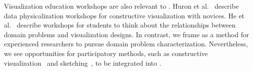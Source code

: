 Visualization education workshops are also relevant to \workshops. Huron et al.~\cite{Huron2016} describe data physicalization workshops for constructive visualization with novices. He et al.~\cite{He2017} describe workshops for students to think about the relationships between domain problems and visualization designs. In contrast, we frame \workshops as a method for experienced researchers to pursue domain problem characterization. Nevertheless, we see opportunities for participatory methods, such as constructive visualization~\cite{Huron2014} and sketching~\cite{Walny2015}, to be integrated into \workshops.